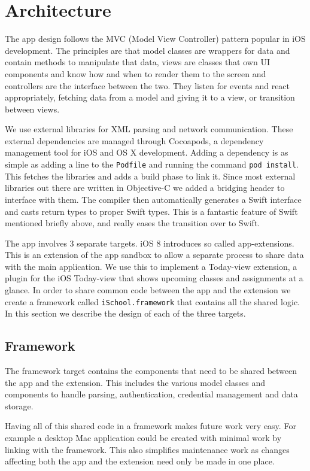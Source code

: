 \documentclass[pdftex, DIV=calc, paper=a4, fontsize=11pt, twocolumn]{scrartcl}	 %
\begin{document}
\section*{Architecture}

The app design follows the MVC (Model View Controller) pattern popular in iOS development.
The principles are that model classes are wrappers for data and contain methods to manipulate that
data, views are classes that own UI components and know how and when to render them to the screen
and controllers are the interface between the two. They listen for events and react appropriately, 
fetching data from a model and giving it to a view, or transition between views.

We use external libraries for XML parsing and network communication. These external dependencies 
are managed through Cocoapods, a dependency management tool for iOS and OS X development. Adding
a dependency is as simple as adding a line to the \texttt{Podfile} and running the command
\texttt{pod install}. This fetches the libraries and adds a build phase to link it. Since most
external libraries out there are written in Objective-C we added a bridging header to interface
with them. The compiler then automatically generates a Swift interface and casts return types to 
proper Swift types. This is a fantastic feature of Swift mentioned briefly above, and really eases
the transition over to Swift.

The app involves 3 separate targets. iOS 8 introduces so called app-extensions. This is an extension
of the app sandbox to allow a separate process to share data with the main application. We use
this to implement a Today-view extension, a plugin for the iOS Today-view that shows upcoming classes
and assignments at a glance. In order to share common code between the app and the extension we
create a framework called \texttt{iSchool.framework} that contains all the shared logic. In this 
section we describe the design of each of the three targets.

\subsection*{Framework}
The framework target contains the components that need to be shared between the app and the extension.
This includes the various model classes and components to handle parsing, authentication, credential
management and data storage.

Having all of this shared code in a framework makes future work very easy. For example a desktop Mac
application could be created with minimal work by linking with the framework. This also simplifies
maintenance work as changes affecting both the app and the extension need only be made in one place.
\end{document}
